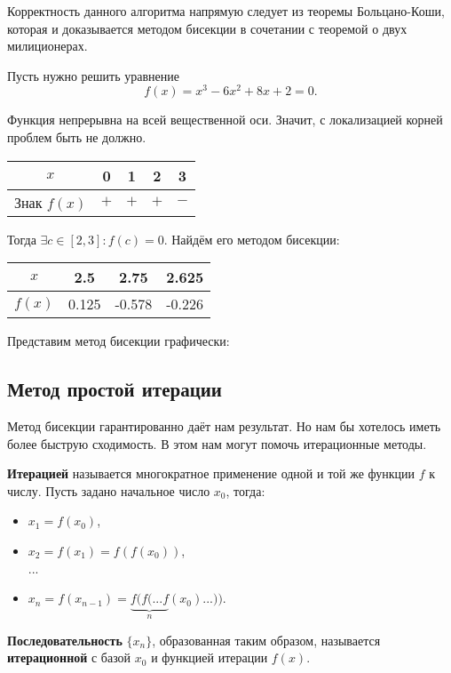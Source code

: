 \documentclass[../main.tex]{subfile}
\begin{document}
Корректность данного алгоритма напрямую следует из теоремы Больцано-Коши, которая
и доказывается методом бисекции в сочетании с теоремой о двух милиционерах.

\begin{example}
	Пусть нужно решить уравнение
	\[f(x)=x^3-6x^2+8x+2=0.\]

	Функция непрерывна на всей вещественной оси. Значит, с локализацией
	корней проблем быть не должно.
	\newline

	\begin{tabular}{ *{5}{|c}| }
		\hline
		$x$		& 0	& 1	& 2	& 3 \\
		\hline
		Знак $f(x)$ 	& $+$	& $+$	& $+$	& $-$ \\
		\hline
	\end{tabular}
	\newline

	Тогда $\exists c\in[2,3]: f(c)=0$. Найдём его методом бисекции:
	\newline

	\begin{tabular}{*{4}{|c}|}
		\hline
		$x$ &	2.5	& 2.75	& 2.625 \\
		\hline
		$f(x)$ &0.125	& -0.578&-0.226 \\
		\hline
	\end{tabular}\leavevmode\newline

	Представим метод бисекции графически:
	\newline

	

\end{example}


\subsection{Метод простой итерации}

Метод бисекции гарантированно даёт нам результат. Но нам бы хотелось иметь
более быструю сходимость. В этом нам могут помочь итерационные методы.

\begin{define}
	\textbf{Итерацией} называется многократное применение одной и той же
	функции $f$ к числу. Пусть задано начальное число $x_0$, тогда:
	\begin{itemize}[noitemsep, nolistsep]
		\item $x_1=f(x_0)$,
		\item $x_2=f(x_1)=f(f(x_0))$,\\
		...
		\item $x_n=f(x_{n-1})=\underset{n}{\underbrace{f(f(...f}}
			(x_0)...))$.
	\end{itemize}

	\textbf{Последовательность} $\{x_n\}$, образованная таким образом,
	называется \textbf{итерационной} с базой $x_0$ и функцией итерации $f(x)$.
\end{define}
\end{document}
